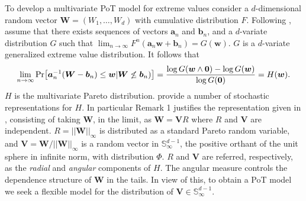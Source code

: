 
To develop a multivariate PoT model for extreme values consider a 
$d$-dimensional random vector $\bm{W} = (W_1, \ldots ,W_d)$ with
cumulative distribution $F$. Following \cite{RoSeWa2018a}, assume 
that there exists sequences of vectors $\bm{a}_n$ and $\bm{b}_n$,
and a $d$-variate distribution $G$ such that 
$\lim_{n\rightarrow\infty} F^n(\bm{a}_n \bm{w} + \bm{b}_n) = 
G(\bm{w})$. $G$ is a $d$-variate generalized extreme value 
distribution. It follows that
\[
    \lim_{n\rightarrow\infty}\prob{\bm{a}^{-1}_n (\bm{W} - \bm{b}_n)
    \leq \bm{w} | \bm{W} \not\leq \bm{b}_n)} = \frac{\log G(\bm{w} 
    \wedge \bm{0}) - \log G(\bm{w}) }{\log G(\bm{0})} = H(\bm{w}).
\]
$H$ is the multivariate Pareto distribution. \cite{RoSeWa2018a}
provide a number of stochastic representations for $H$. In particular
Remark 1 justifies the representation given in \cite{ferreira2014},
consisting of taking $\bm{W}$, in the limit, as $\bm{W} = \bm{V}R$ 
where $R$ and $\bm{V}$ are independent. $R = ||\bm{W}||_\infty$ is 
distributed as a standard Pareto  random variable, and $\bm{V} = 
\bm{W}/||\bm{W}||_\infty$ is a random vector in  
$\mathbb{S}_{\infty}^{d-1}$, the positive orthant of the 
unit  sphere in infinite norm, with distribution $\Phi$. 
$R$ and $\bm{V}$ are referred, respectively, as the {\em radial} 
and {\em angular}  components of $H$. The angular measure controls 
the dependence  structure of $\bm{W}$  in the tails. In view of 
this, to obtain a  PoT model we seek a flexible model for the 
distribution of $\bm{V} \in {\mathbb S}_{\infty}^{d-1}$.

